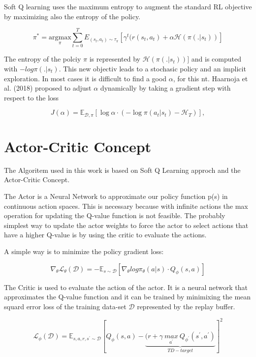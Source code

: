 Soft Q learning uses the maximum entropy to augment the standard RL objective 
by maximizing also the entropy of the policy. 

\begin{equation}
  \pi^* = \underset{\pi}{\mathrm{argmax}} \sum_{t=0}^{T} E_{(s_t, a_t) \sim \tau_{\pi}}[\gamma^t (r(s_t, a_t) + \alpha \mathcal{H}(\pi(.|s_t))]
\end{equation}

The entropy of the polciy $\pi$ is represented by $\mathcal{H}(\pi(.|s_t))]$ and is computed with $-log\pi(.|s_t)$.
This new objectiv leads to a stochasic policy and an implicit exploration.
In most cases it is difficult to find a good $\alpha$, for this nt. Haarnoja et al. (2018) proposed to adjust $\alpha$  dynamically by taking a
gradient step with respect to the loss 

\begin{equation}\label{eq:entropy_temp}
J(\alpha)= \mathbb{E}_{\mathcal{D}, \pi}
\left[
    \log \alpha \cdot  (
        -\log \pi( a_{t} | s_{t} )
        -
        \mathcal{H}_T
    )
\right],
\end{equation}


\section{Actor-Critic Concept}

The Algoritem used in this work is based on Soft Q Learning approch and the Actor-Critic Concept.

The Actor is a Neural Network to approximate our policy function p(s) in continuous action spaces.  
This is necessary because with infinite actions the max operation for updating the Q-value function is not feasible. The probably simplest way to update the 
actor weights to force the actor to select actions that have a higher Q-value is by using the critic to evaluate the actions.

A simple way is to minimize the policy gradient loss:

\begin{equation}
  \nabla_{\theta} \mathcal{L}_{\theta}(\mathcal{D}) = - \mathbb{E}_{s \sim \mathcal{D}} [\nabla_{\theta} log \pi_{\theta}(a|s) \cdot Q_{\phi}(s,a)]
\end{equation}


The Critic is used to evaluate the action of the actor. It is a neural network that approximates the Q-value function and it can be trained by minimixing the mean squard error loss
of the training data-set $\mathcal{D}$ represented by the replay buffer. 

\begin{equation}
  \mathcal{L}_{\phi}(\mathcal{D}) =  \mathbb{E}_{s,a, r, s^{\prime} \sim \mathcal{D}} [Q_{\phi}(s,a) - \underbrace{( r + \gamma \: \underset{a^{\prime}}{max} \:  Q_{\phi^{\prime}}(s^{\prime},a^{\prime})}_{TD - target}]^{2}
\end{equation}



